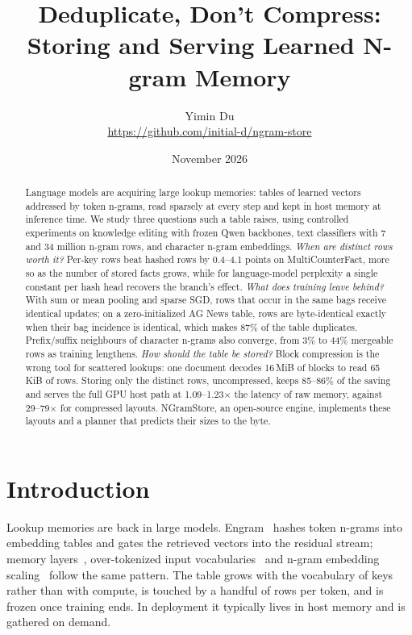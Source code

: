 \documentclass[10pt]{article}
\title{\vspace{-1.2em}\textbf{Deduplicate, Don't Compress:}\\[0.15em]
\Large Storing and Serving Learned N-gram Memory}
\author{Yimin Du\\[0.2em]{\small \url{https://github.com/initial-d/ngram-store}}}
\date{\small November 2026}
\newcommand{\x}{$\times$}
\begin{document}
\maketitle

\begin{abstract}
\noindent Language models are acquiring large lookup memories: tables of learned vectors addressed by token n-grams, read sparsely at every step and kept in host memory at inference time.
We study three questions such a table raises, using controlled experiments on knowledge editing with frozen Qwen backbones, text classifiers with 7 and 34 million n-gram rows, and character n-gram embeddings.
\emph{When are distinct rows worth it?} Per-key rows beat hashed rows by 0.4--4.1 points on MultiCounterFact, more so as the number of stored facts grows, while for language-model perplexity a single constant per hash head recovers the branch's effect.
\emph{What does training leave behind?} With sum or mean pooling and sparse SGD, rows that occur in the same bags receive identical updates; on a zero-initialized AG News table, rows are byte-identical exactly when their bag incidence is identical, which makes 87\% of the table duplicates. Prefix/suffix neighbours of character n-grams also converge, from 3\% to 44\% mergeable rows as training lengthens.
\emph{How should the table be stored?} Block compression is the wrong tool for scattered lookups: one document decodes 16\,MiB of blocks to read 65\,KiB of rows. Storing only the distinct rows, uncompressed, keeps 85--86\% of the saving and serves the full GPU host path at 1.09--1.23\x{} the latency of raw memory, against 29--79\x{} for compressed layouts. NGramStore, an open-source engine, implements these layouts and a planner that predicts their sizes to the byte.
\end{abstract}

\section{Introduction}

Lookup memories are back in large models. Engram~\citep{deepseek2026engram} hashes token n-grams into embedding tables and gates the retrieved vectors into the residual stream; memory layers~\citep{lample2019large,berges2024memory}, over-tokenized input vocabularies~\citep{huang2025overtokenized} and n-gram embedding scaling~\citep{yu2025scone} follow the same pattern. The table grows with the vocabulary of keys rather than with compute, is touched by a handful of rows per token, and is frozen once training ends. In deployment it typically lives in host memory and is gathered on demand.
\end{document}
